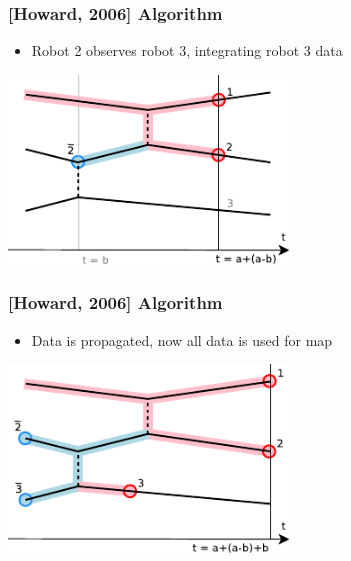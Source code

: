 \begin{frame}
\frametitle{[Howard, 2006] Algorithm}
\begin{itemize}
\item Robot 2 observes robot 3, integrating robot 3 data
\end{itemize}
\begin{center}
\includegraphics[height=5cm]{../FiguresAndMovies/Howard5b}
\end{center}
\end{frame}

\begin{frame}
\frametitle{[Howard, 2006] Algorithm}
\begin{itemize}
\item Data is propagated, now all data is used for map
\end{itemize}
\begin{center}
\includegraphics[height=5cm]{../FiguresAndMovies/Howard5c}
\end{center}
\end{frame}

